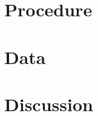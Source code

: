 \documentclass{article} %
\begin{document}
\section {Procedure}










\section {Data}











\section {Discussion}
\end{document}
